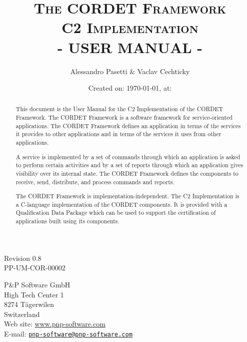 \documentclass[a4paper,10pt]{article}
\title{\textsc{The CORDET Framework} \\ \textsc{C2 Implementation} \\ \textsc{- USER MANUAL -}}
\author{Alessandro Pasetti \& Vaclav Cechticky}
\date{Created on: \today{}, at: \currenttime{}}
\newcommand{\docIssue}{0.8}						%
\newcommand{\docRefNumber}{PP-UM-COR-00002}		%
\begin{document}
\maketitle

\begin{center}
Revision \docIssue{} \\
\docRefNumber{}
\end{center}

\begin{center}
P\&P Software GmbH \\
High Tech Center 1 \\
8274 T\"{a}gerwilen \\
Switzerland \\
\vspace{2mm}
Web site: \url{www.pnp-software.com}\\
E-mail: \href{mailto:pnp-software@pnp-software.com}{\nolinkurl{pnp-software@pnp-software.com}} 
\end{center}

\begin{table}[ht]
\begin{center}
\begin{tabular}{p{11.7cm}}
\\
\hline
\end{tabular}
\end{center}
\end{table}
\begin{abstract}
This document is the User Manual for the C2 Implementation of the CORDET Framework. The CORDET Framework is a software framework for service-oriented applications. The CORDET Framework defines an application in terms of the services it provides to other applications and in terms of the services it uses from other applications.
\par
A service is implemented by a set of commands through which an application is asked to perform certain activities and by a set of reports through which an application gives visibility over its internal state. The CORDET Framework defines the components to receive, send, distribute, and process commands and reports.
\par
The CORDET Framework is implementation-independent. The C2 Implementation is a C-language implementation of the CORDET components. It is provided with a Qualification Data Package which can be used to support the certification of applications built using its components.

\end{abstract}
\begin{table}[ht]
\begin{center}
\begin{tabular}{p{11.7cm}}
\\
\hline
\end{tabular}
\end{center}
\end{table}
\end{document}
